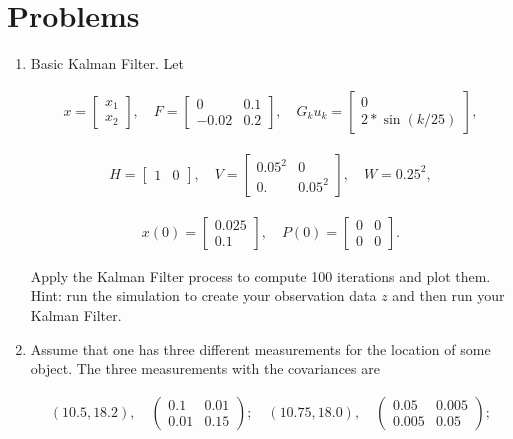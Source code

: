\hypertarget{problems-1}{%
\section{Problems}\label{problems-1}}

\begin{enumerate}
\item
  Basic Kalman Filter. Let

  \[\begin{aligned}
  x = \begin{bmatrix}x_1 \\ x_2\end{bmatrix}, \quad F = \begin{bmatrix} 0 &0.1 \\-0.02 &0.2\end{bmatrix}, \quad G_k u_k= \begin{bmatrix} 0\\ 2*\sin(k/25)\end{bmatrix},
  \end{aligned}\]

  \[\begin{aligned}
  H = \begin{bmatrix} 1& 0 \end{bmatrix},
  \quad V = \begin{bmatrix} 0.05^2&0\\0.& 0.05^2\end{bmatrix}, \quad W = 0.25^2,
  \end{aligned}\]

  \[\begin{aligned}
  x(0) = \begin{bmatrix} 0.025\\0.1\end{bmatrix}, \quad P(0) = \begin{bmatrix}0 & 0\\ 0&0\end{bmatrix}.
  \end{aligned}\]

  Apply the Kalman Filter process to compute 100 iterations and plot
  them. Hint: run the simulation to create your observation data \(z\)
  and then run your Kalman Filter.
\item
  Assume that one has three different measurements for the location of
  some object. The three measurements with the covariances are

  \[\begin{aligned}
  (10.5, 18.2), \quad \left(\begin{array}{cc} 0.1 & 0.01 \\ 0.01 & 0.15
    \end{array}\right); \quad
  (10.75, 18.0), \quad \left(\begin{array}{cc} 0.05 & 0.005 \\ 0.005 & 0.05
      \end{array}\right);
  \end{aligned}\]


\end{enumerate}
